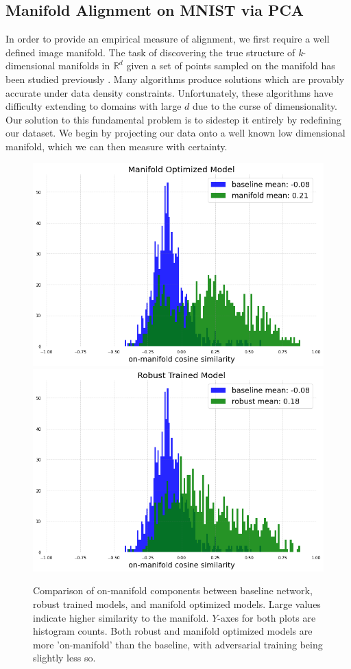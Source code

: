 \subsection{Manifold Alignment on MNIST via PCA} \label{subsec:mae}

In order to provide an empirical measure of alignment, we first require a well defined image manifold.
The task of discovering the true structure of \textit{k}-dimensional manifolds in $\mathds{R}^d$ given a set of points sampled on the manifold has been studied previously \citep{khoury2018}.
Many algorithms produce solutions which are provably accurate under data density constraints.
Unfortunately, these algorithms have difficulty extending to domains with large $d$ due to the curse of dimensionality.
Our solution to this fundamental problem is to sidestep it entirely by redefining our dataset.
We begin by projecting our data onto a well known low dimensional manifold, which we can then measure with certainty.
\begin{figure}[ht]
\begin{center}

    \includegraphics[width=0.45\linewidth]{c3_figures/manifold_model_cosine_hist.png}\includegraphics[width=0.45\linewidth]{c3_figures/robust_model_cosine_hist.png}
\end{center}
    \caption{Comparison of on-manifold components between baseline network, robust trained models, and manifold optimized models. Large values indicate higher similarity to the manifold. $Y$-axes for both plots are histogram counts. Both robust and manifold optimized models are more 'on-manifold' than the baseline, with adversarial training being slightly less so.}
    \label{fig:hist_cosine}
\end{figure}

